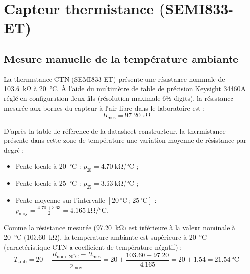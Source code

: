 \section{Capteur thermistance (SEMI833-ET)}

\subsection{Mesure manuelle de la température ambiante}
\label{subsec:ntc_ambiante}

La thermistance CTN (SEMI833-ET) présente une résistance nominale de \qty{103.6}{\kilo\ohm} à \qty{20}{\degreeCelsius}. 
À l'aide du multimètre de table de précision Keysight 34460A réglé en configuration deux fils (résolution maximale 6½ digits), la résistance mesurée aux bornes du capteur à l'air libre dans le laboratoire est :
\begin{equation}
    R_{\text{mes}} = \qty{97.20}{\kilo\ohm}
\end{equation}

D'après la table de référence de la datasheet constructeur, la thermistance présente dans cette zone de température une variation moyenne de résistance par degré :
\begin{itemize}[leftmargin=1.2cm]
    \item Pente locale à \qty{20}{\degreeCelsius} : $p_{20} = \qty{4.70}{\kilo\ohm\per\degreeCelsius}$ ;
    \item Pente locale à \qty{25}{\degreeCelsius} : $p_{25} = \qty{3.63}{\kilo\ohm\per\degreeCelsius}$ ;
    \item Pente moyenne sur l'intervalle $[20\,^\circ\text{C}\,;\,25\,^\circ\text{C}]$ : $p_{\text{moy}} = \frac{4.70 + 3.63}{2} = \qty{4.165}{\kilo\ohm\per\degreeCelsius}$.
\end{itemize}

Comme la résistance mesurée (\qty{97.20}{\kilo\ohm}) est inférieure à la valeur nominale à \qty{20}{\degreeCelsius} (\qty{103.60}{\kilo\ohm}), la température ambiante est supérieure à \qty{20}{\degreeCelsius} (caractéristique CTN à coefficient de température négatif) :
\begin{equation}
    T_{\text{amb}} = 20 + \frac{R_{\text{nom, } 20^\circ\text{C}} - R_{\text{mes}}}{p_{\text{moy}}} = 20 + \frac{103.60 - 97.20}{4.165} = 20 + 1.54 = \qty{21.54}{\degreeCelsius}
\end{equation}

